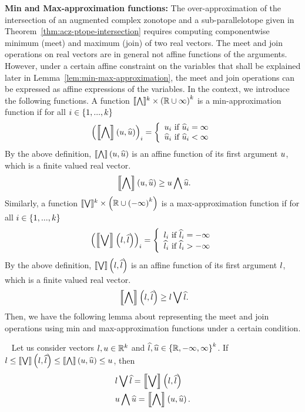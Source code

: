 {\bf Min and Max-approximation functions:} The over-approximation of
the intersection of an augmented complex zonotope and a
sub-parallelotope given in Theorem~\ref{thm:acz-ptope-intersection}
requires computing componentwise minimum (meet) and maximum (join) of
two real vectors.  The meet and join operations on real vectors are in
general not affine functions of the arguments.  However, under a
certain affine constraint on the variables that shall be explained
later in Lemma~\ref{lem:min-max-approximation}, the meet and join operations can be
expressed as affine expressions of the variables.  In the context, we
introduce the following functions.  A function
$\minapproxsymbol:\reals^k\times\lt(\reals\cup\infty\rt)^k$ is a
min-approximation function if for all $i\in\set{1,...,k}$
%
\[
\lt(\minapprox{\ub}{\pub}\rt)_i=
\lt\{
\begin{array}{l}
\ub_i~\text{if}~\pub_i=\infty\\
\pub_i~\text{if}~\pub_i<\infty
\end{array}
\rt.
\]
%
By the above definition, $\minapprox{\ub}{\pub}$ is an affine function of its
first argument $\ub$, which is a finite valued real vector.
%
\begin{equation}~\label{eqn:minapprox}
\minapprox{\ub}{\pub}\geq\meet{\ub}{\pub}.
\end{equation}
%
Similarly, a function
$\maxapproxsymbol:\reals^k\times\lt(\reals\cup\lt(-\infty\rt)^k\rt)$
is a max-approximation function if for all $i\in\set{1,...,k}$
%
\[
\lt(\maxapprox{\lb}{\plb}\rt)_i=
\lt\{
\begin{array}{l}
\lb_i~\text{if}~\plb_i=-\infty\\
\plb_i~\text{if}~\plb_i>-\infty
\end{array}
\rt.
\]
%
By the above definition, $\maxapprox{\lb}{\plb}$ is an affine function
of its first argument $\lb$, which is a finite valued real vector.
%
\begin{equation}~\label{eqn:minapprox}
\minapprox{\lb}{\plb}\geq\join{\lb}{\plb}.
\end{equation}
%
Then, we have the following lemma about representing the meet and join
operations using min and max-approximation functions under a certain
condition.
%
\begin{lemma}~\label{lem:min-max-approximation}
Let us consider vectors $\lb,\ub\in\reals^k$ and
$\plb,\pub\in\set{\reals,-\infty,\infty}^k$.  If
$\lb\leq\maxapprox{\lb}{\plb}\leq\minapprox{\ub}{\pub}\leq\ub$, then
%
\begin{align*}
& \join{\lb}{\plb}=\maxapprox{\lb}{\plb}\\
& \meet{\ub}{\pub}=\minapprox{\ub}{\pub}.
\end{align*}
%
\end{lemma}
